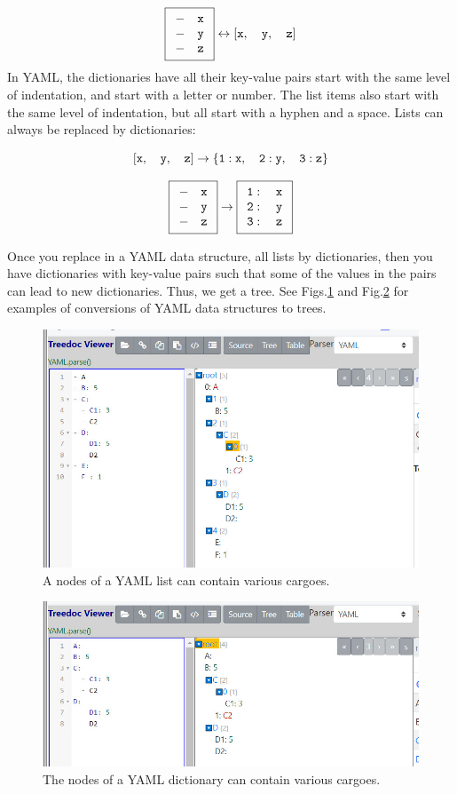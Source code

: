 $$
\boxed{
\begin{array}{l}
\tt{- \quad x}\\
\tt{-\quad y}\\
\tt{-\quad z}
\end{array}}
\leftrightarrow
{\tt [x,\quad y,\quad z]}
$$
In YAML, the dictionaries
have all their key-value
pairs start with the same level of indentation, and start with a letter or number.
The list items also start with
the same level of indentation, but all start with a hyphen and a space.
Lists can always be replaced by dictionaries:

$${\tt [x,\quad y,\quad z] \rightarrow
\{1:x, \quad 2:y,\quad 3:z\}}
$$

$$
\boxed{
\begin{array}{l}
\tt{- \quad x}\\
\tt{-\quad y}\\
\tt{-\quad z}
\end{array}}
\rightarrow
\boxed{
\begin{array}{l}
\tt{1: \quad x}\\
\tt{2: \quad y}\\
\tt{3:\quad z}
\end{array}}
$$

Once you replace in
a YAML data structure, all lists
by dictionaries,
then you have dictionaries 
with key-value pairs such that
some of the values in the pairs can lead to new dictionaries. Thus, we get a tree. See Figs.\ref{fig-yaml-list-nodes}
and Fig.\ref{fig-yaml-dict-nodes}
for examples of conversions
of YAML data structures to trees.


\begin{figure}[h!]
\centering
\includegraphics[width=6in]
{yaml/yaml-list-nodes.jpg}
\caption{A nodes of a YAML list can contain various cargoes.}
\label{fig-yaml-list-nodes}
\end{figure}

\begin{figure}[h!]
\centering
\includegraphics[width=6in]
{yaml/yaml-dict-nodes.jpg}
\caption{The nodes of a YAML dictionary can contain various cargoes. }
\label{fig-yaml-dict-nodes}
\end{figure}
